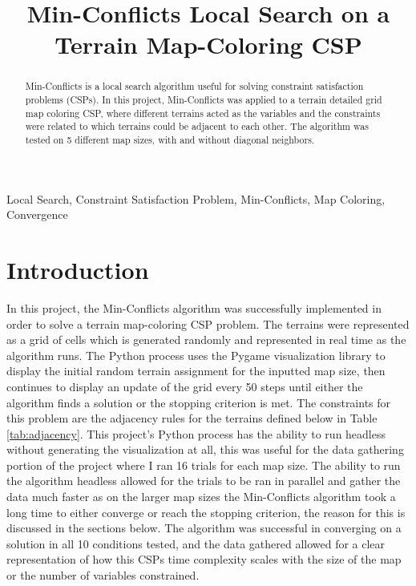 \documentclass[conference]{IEEEtran}
\begin{document}
\title{Min-Conflicts Local Search on a Terrain Map-Coloring CSP}

\author{
}

\maketitle

\begin{abstract}
    Min-Conflicts is a local search algorithm useful for solving constraint satisfaction problems (CSPs). In this project, Min-Conflicts was applied to a terrain detailed grid map coloring CSP, where different terrains acted as the variables and the constraints were related to which terrains could be adjacent to each other. The algorithm was tested on 5 different map sizes, with and without diagonal neighbors.
\end{abstract}

\begin{IEEEkeywords}
    Local Search, Constraint Satisfaction Problem, Min-Conflicts, Map Coloring, Convergence
\end{IEEEkeywords}

\section{Introduction}
    In this project, the Min-Conflicts algorithm was successfully implemented in order to solve a terrain map-coloring CSP problem. The terrains were represented as a grid of cells which is generated randomly and represented in real time as the algorithm runs. The Python process uses the Pygame visualization library to display the initial random terrain assignment for the inputted map size, then continues to display an update of the grid every 50 steps until either the algorithm finds a solution or the stopping criterion is met. The constraints for this problem are the adjacency rules for the terrains defined below in Table \ref{tab:adjacency}. This project's Python process has the ability to run headless without generating the visualization at all, this was useful for the data gathering portion of the project where I ran 16 trials for each map size. The ability to run the algorithm headless allowed for the trials to be ran in parallel and gather the data much faster as on the larger map sizes the Min-Conflicts algorithm took a long time to either converge or reach the stopping criterion, the reason for this is discussed in the sections below. The algorithm was successful in converging on a solution in all 10 conditions tested, and the data gathered allowed for a clear representation of how this CSPs time complexity scales with the size of the map or the number of variables constrained.
\end{document}

